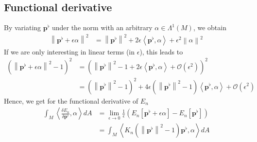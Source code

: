 \documentclass{scrartcl}
\newcommand{\M}{M}
\newcommand{\dA}{dA}
\newcommand{\pfl}{\mathbf{p}^{\flat}}
\newcommand{\EN}{E_{n}}
\renewcommand{\O}{\mathcal{O}}
\begin{document}
  \subsection{Functional derivative}

  By variating \( \pfl \) under the norm with an arbitrary \( \alpha\in\Lambda^{1}(\M) \), we obtain
  \begin{align}
    \left\| \pfl + \epsilon \alpha \right\|^{2} &= \left\| \pfl \right\|^{2} 
                                                  + 2\epsilon\left\langle \pfl, \alpha \right\rangle
                                                  + \epsilon^{2}\left\| \alpha \right\|^{2}
  \end{align}
  If we are only interesting in linear terms (in \( \epsilon \)), this leads to
  \begin{align}
    \left( \left\| \pfl + \epsilon \alpha \right\|^{2} - 1 \right)^{2}
            &= \left( \left\| \pfl \right\|^{2} - 1  + 2\epsilon\left\langle \pfl, \alpha \right\rangle 
                  + \O\left( \epsilon^{2} \right) \right)^{2}\\
            &= \left( \left\| \pfl \right\|^{2} - 1 \right)^{2} 
                + 4\epsilon\left(\left\| \pfl \right\|^{2} - 1 \right)\left\langle \pfl, \alpha \right\rangle
                + \O\left( \epsilon^{2} \right)
  \end{align}
  Hence, we get for the functional derivative of \( \EN \)
  \begin{align}
    \int_{\M} \left\langle\frac{\delta\EN}{\delta\pfl} , \alpha \right\rangle \dA
      &= \lim_{\epsilon\rightarrow 0} \frac{1}{\epsilon}\left( \EN\left[ \pfl + \epsilon\alpha \right] - \EN\left[ \pfl\right]\right) \\
      &= \int_{\M} \left\langle K_{n} \left( \left\| \pfl \right\|^{2} - 1 \right)\pfl , \alpha \right\rangle \dA
  \end{align}
\end{document}
